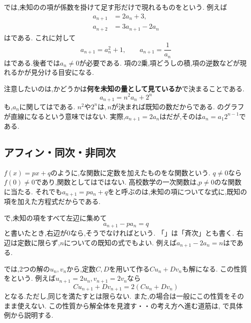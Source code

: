     では,未知のの項が係数を掛けて足す形だけで現れるものを\textbf{}という.
    例えば
    \begin{align*}
      a_{n+1}&=2a_n+3,\\
      a_{n+2}&=3a_{n+1}-2a_n
    \end{align*}
    はである.
    これに対して
    \[
      a_{n+1}=a_n^2+1,\qquad
      a_{n+1}=\frac{1}{a_n}
    \]
    はである.後者では$a_n\ne0$が必要である.
    項の2乗,項どうしの積,項の逆数などが現れるかが見分ける目安になる.

    注意したいのは,かどうかは\textbf{何を未知の量として見ているか}で決まることである.
    \[
      a_{n+1}=n^2a_n+2^n
    \]
    も,$a_n$に関してはである.
    $n^2$や$2^n$は,\,$n$が決まれば既知の数だからである.
    のグラフが直線になるという意味ではない.
    実際,$a_{n+1}=2a_n$はだが,そのは$a_n=a_1 2^{n-1}$である.

  \subsection{アフィン・同次・非同次}\label{節：アフィン・同次・非同次}
    $f(x)=px+q$のように,な関数に定数を加えたものを\textbf{}な関数という.
    $q\ne0$なら$f(0)\ne0$であり,関数としてはではない.
    高校数学の一次関数は,$p\ne0$のな関数に当たる.
    それでも$a_{n+1}=pa_n+q$をと呼ぶのは,未知の項についてな式に,既知の項を加えた方程式だからである.

    で,未知の項をすべて左辺に集めて
    \[
      a_{n+1}-pa_n=q
    \]
    と書いたとき,右辺が$0$なら\textbf{},そうでなければ\textbf{}という.
    「」は「斉次」とも書く.
    右辺は定数に限らず,$n$についての既知の式でもよい.
    例えば$a_{n+1}-2a_n=n$はである.

    では,2つの解の$u_n,v_n$から,定数$C,D$を用いて作る$Cu_n+Dv_n$も解になる.
    この性質を\textbf{}という.
    例えば$u_{n+1}=2u_n$,\,$v_{n+1}=2v_n$なら
    \[
      Cu_{n+1}+Dv_{n+1}=2(Cu_n+Dv_n)
    \]
    となる.ただし,同じを満たすとは限らない.
    また,の場合は一般にこの性質をそのまま使えない.
    この性質から解全体を見渡す・・の考え方へ進む道筋は,
    で具体例から説明する.

